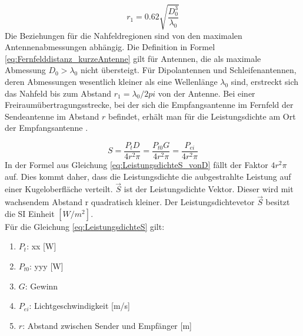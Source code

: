 \begin{equation}
r_{1}=0.62\sqrt{\dfrac{D_{0}^{3}}{\lambda_{0}}} \label{eq:Fernfelddistanz_kurzeAntenne}
\end{equation}
Die Beziehungen für die Nahfeldregionen sind von den maximalen Antennenabmessungen abhängig.  Die Definition in Formel \ref{eq:Fernfelddistanz_kurzeAntenne} gilt für Antennen, die als maximale Abmessung $D_{0}>\lambda_{0}$ nicht übersteigt.
Für Dipolantennen und Schleifenantennen, deren Abmessungen wesentlich kleiner als eine Wellenlänge $\lambda_{0}$ sind, erstreckt sich das Nahfeld bis zum  Abstand   $r_{1}=\lambda_{0}/2pi$ von der Antenne.
Bei einer Freiraumübertragungsstrecke, bei der sich die Empfangsantenne im Fernfeld der Sendeantenne im Abstand $r$ befindet, erhält man für die Leistungsdichte am Ort der Empfangsantenne \cite{meinke1992taschenbuch}.

\begin{equation}
S=\dfrac{P_{t}D}{4r^{2}\pi} = \dfrac{P_{t0}G}{4r^{2}\pi}=\dfrac{P_{ei}}{4r^{2}\pi}\label{eq:LeistungsdichteS_vonD}
\end{equation}
In der Formel aus Gleichung \ref{eq:LeistungsdichteS_vonD} fällt der Faktor $4r^{2}\pi$ auf. Dies kommt daher, dass die Leistungsdichte die aubgestrahlte Leistung auf einer Kugeloberfläche verteilt. $\vec{S}$ ist der Leistungsdichte Vektor. Dieser wird mit wachsendem Abstand r quadratisch kleiner. Der Leistungsdichtevetor $\vec{S}$ besitzt die SI Einheit  $[W/m^{2}]$.\\
Für die Gleichung \ref {eq:LeistungsdichteS} gilt:
\begin{enumerate}[leftmargin=2cm]
   \item[] $P_t$: xx [W]
   \item[] $P_{t0}$: yyy [W]
   \item[] $G$: Gewinn 
   \item[] $P_{ei}$: Lichtgeschwindigkeit  [m/s] 
   \item[] $r$: Abstand zwischen Sender und Empfänger [m]
\end{enumerate} 




